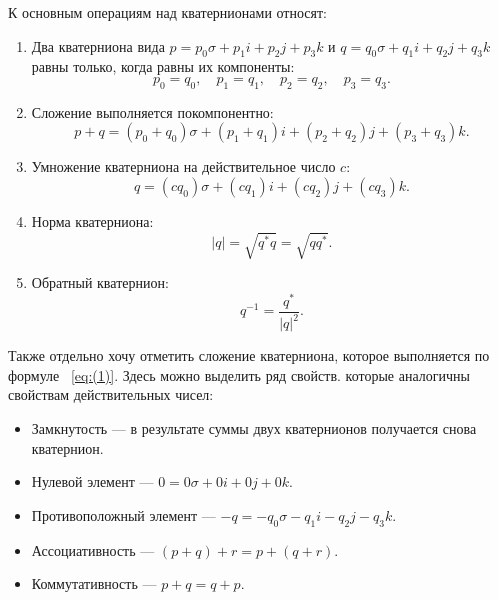 К основным операциям над кватернионами относят:
\begin{enumerate}
    \item Два кватерниона вида $p = p_0 \sigma + p_1 i + p_2 j + p_3 k$ и $q = q_0 \sigma + q_1 i + q_2 j + q_3 k$ равны только, когда равны их компоненты:
        \begin{equation*}
            p_0 = q_0, \quad p_1 = q_1, \quad p_2 = q_2, \quad p_3 = q_3.
        \end{equation*}
    \item Сложение выполняется покомпонентно:
        \begin{equation}
            p + q = (p_0 + q_0)\sigma + (p_1 + q_1)i + (p_2 + q_2)j + (p_3 + q_3)k.
            \label{eq:(1)}
        \end{equation}
    \item Умножение кватерниона на действительное число $c$:
        \begin{equation*}
            q = (c q_0)\sigma + (c q_1)i + (c q_2)j + (c q_3)k.
        \end{equation*}
    \item Норма кватерниона:
        \begin{equation}
            |q| = \sqrt{q^* q} = \sqrt{q q^*}.
            \label{eq:(2)}
        \end{equation}
    \item Обратный кватернион:
        \begin{equation}
            q^{-1} = \frac{q^*}{|q|^2}.
            \label{eq:(3)}
        \end{equation}
\end{enumerate}

Также отдельно хочу отметить сложение кватерниона, которое выполняется по формуле ~\eqref{eq:(1)}. Здесь можно выделить ряд свойств. которые аналогичны свойствам действительных чисел:
\begin{itemize}
    \item Замкнутость --- в результате суммы двух кватернионов получается снова кватернион.
    \item Нулевой элемент --- $0 = 0\sigma + 0i + 0j + 0k$.
    \item Противоположный элемент --- $-q = -q_0\sigma - q_1 i - q_2 j - q_3 k$.
    \item Ассоциативность --- $(p + q) + r = p + (q + r)$.
    \item Коммутативность --- $p + q = q + p$.
\end{itemize}

